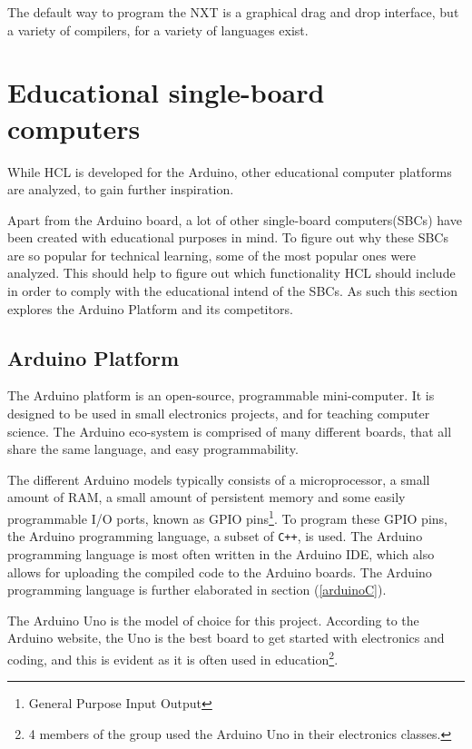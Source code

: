 The default way to program the NXT is a graphical drag and drop interface, but a variety of compilers, for a variety of languages exist.











\section{Educational single-board computers}
While HCL is developed for the Arduino, other educational computer platforms are analyzed, to gain further inspiration.

Apart from the Arduino board, a lot of other single-board computers(SBCs) have been created with educational purposes in mind.
To figure out why these SBCs are so popular for technical learning, some of the most popular ones were analyzed.
This should help to figure out which functionality HCL should include in order to comply with the educational intend of the SBCs\cite{SBC}.
As such this section explores the Arduino Platform and its competitors.

\subsection{Arduino Platform}
The Arduino platform is an open-source, programmable mini-computer\cite{ArFAQ}.
It is designed to be used in small electronics projects, and for teaching computer science.
The Arduino eco-system is comprised of many different boards, that all share the same language, and easy programmability.

The different Arduino models typically consists of a microprocessor, a small amount of RAM, a small amount of persistent memory and some easily programmable I/O ports, known as GPIO pins\footnote{General Purpose Input Output}.
To program these GPIO pins, the Arduino programming language, a subset of \texttt{C++}, is used.
The Arduino programming language is most often written in the Arduino IDE, which also allows for uploading the compiled code to the Arduino boards.
The Arduino programming language is further elaborated in section (\ref{arduinoC}).

The Arduino Uno is the model of choice for this project.
According to the Arduino website, the Uno is the best board to get started with electronics and coding, and this is evident as it is often used in education\footnote{4 members of the group used the Arduino Uno in their electronics classes.}\cite{ArduinoUno}.

